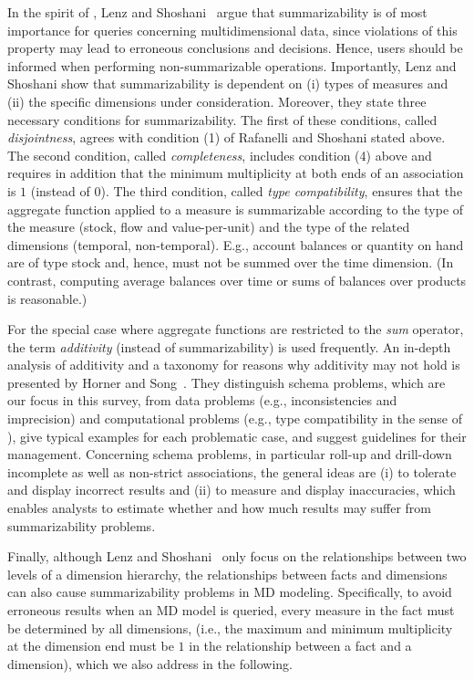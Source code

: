In the spirit of \cite{DBLP:conf/ssdbm/RafanelliS90}, Lenz and
Shoshani~\cite{DBLP:conf/ssdbm/LenzS97} argue that summarizability
is of most importance for queries concerning multidimensional data,
since violations of this property may lead to erroneous conclusions
and decisions.  Hence, users should be informed when performing
non-summarizable operations.  Importantly, Lenz and Shoshani show
that summarizability is dependent on (i) types of measures and (ii)
the specific dimensions under consideration.  Moreover, they state
three necessary conditions for summarizability.  The first of these
conditions, called \emph{disjointness}, agrees with condition (1) of
Rafanelli and Shoshani stated above.  The second condition, called
\emph{completeness}, includes condition (4) above and requires in
addition that the minimum multiplicity at both ends of an
association is $1$ (instead of $0$).  The third condition, called
\emph{type compatibility}, ensures that the aggregate function
applied to a measure is summarizable according to the type of the
measure (stock, flow and value-per-unit) and the type of the related
dimensions (temporal, non-temporal).  E.g., account balances or
quantity on hand are of type stock and, hence, must not be summed
over the time dimension.  (In contrast, computing average balances
over time or sums of balances over products is reasonable.)

For the special case where aggregate functions are restricted to the
\emph{sum} operator, the term \emph{additivity} (instead of
summarizability) is used frequently. An in-depth analysis of
additivity and a taxonomy for reasons why additivity may not hold is
presented by Horner and Song~\cite{DBLP:conf/er/HornerS05}.  They
distinguish schema problems, which are our focus in this survey,
from data problems (e.g., inconsistencies and imprecision) and
computational problems (e.g., type compatibility in the sense of
\cite{DBLP:conf/ssdbm/LenzS97}), give typical examples for each
problematic case, and suggest guidelines for their management.
Concerning schema problems, in particular roll-up and drill-down
incomplete as well as non-strict associations, the general ideas are
(i) to tolerate and display incorrect results and (ii) to measure
and display inaccuracies, which enables analysts to estimate whether
and how much results may suffer from summarizability problems.

Finally, although Lenz and Shoshani~\cite{DBLP:conf/ssdbm/LenzS97}
only focus on the relationships between two levels of a dimension
hierarchy, the relationships between facts and dimensions can also
cause summarizability problems in MD modeling. Specifically, to
avoid erroneous results when an MD model is queried, every measure
in the fact must be determined by all dimensions, (i.e., the maximum
and minimum multiplicity at the dimension end must be $1$ in the
relationship between a fact and a dimension), which we also address
in the following.

